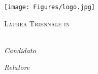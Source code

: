 \documentclass[
11pt, %
italian, 
singlespacing, %
headsepline, %
]{MastersDoctoralThesis} %
\author{Mario Francesco Pio  \textsc{Lapadula}} %
\theoremstyle{plain}
\theoremstyle{definition}
\theoremstyle{remark}
\begin{document}



\pagestyle{plain} %
\begin{titlepage}
	\begin{center}
		
		\texttt{[image: Figures/logo.jpg]} %
            
		{\color{black}{\scshape\LARGE \univname \par}\vspace{1.2cm}} %
		
		\textsc{\Large Laurea Triennale in
			\degreename}\\[0.5cm] %
		
		\HRule \\[2cm] %
		{\huge \bfseries \ttitle\par}\vspace{1cm} %
		
		\begin{minipage}[t]{0.4\textwidth}
			\begin{flushleft} \large
				\emph{Candidato}\\
				\href{}{\authorname} %
			\end{flushleft}
		\end{minipage}
		\begin{minipage}[t]{0.4\textwidth}
			\begin{flushright} \large
				\emph{Relatore} \\
				\href{}{\supname} \\ %
				\phantom{null}\newline 
			\end{flushright}
		\end{minipage}\\[2cm]
		

\end{center}
\end{titlepage}
\end{document}
